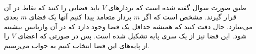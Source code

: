 \\
طبق صورت سوال گفته شده است که بردار‌های
$V$
باید فضایی را
کنند که نقاط در آن قرار گیرند.
مشخص است که اگر
$m$
بردار متعامد پیدا کنیم
آنها یک فضای
$m$
بعدی می‌سازد. حال دقت کنید که همیشه حداقل یک فضا وجود دارد که در آن واریانس بیشینه شود. این فضا نیز
از یک سری پایه تشکیل شده است. پس در صورتی که اعضای
$V$
را از پایه‌های این فضا انتخاب کنیم به جواب می‌رسیم.




